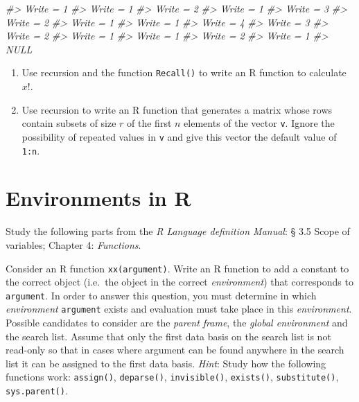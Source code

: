 \documentclass[
]{book}
\newenvironment{Shaded}{\begin{snugshade}}{\end{snugshade}}
\newcommand{\CommentTok}[1]{\textcolor[rgb]{0.56,0.35,0.01}{\textit{#1}}}
\begin{document}
\begin{Shaded}
\begin{Highlighting}[]
\CommentTok{\#\textgreater{} Write =  1 }
\CommentTok{\#\textgreater{} Write =  1 }
\CommentTok{\#\textgreater{} Write =  2 }
\CommentTok{\#\textgreater{} Write =  1 }
\CommentTok{\#\textgreater{} Write =  3 }
\CommentTok{\#\textgreater{} Write =  2 }
\CommentTok{\#\textgreater{} Write =  1 }
\CommentTok{\#\textgreater{} Write =  1 }
\CommentTok{\#\textgreater{} Write =  4 }
\CommentTok{\#\textgreater{} Write =  3 }
\CommentTok{\#\textgreater{} Write =  2 }
\CommentTok{\#\textgreater{} Write =  1 }
\CommentTok{\#\textgreater{} Write =  1 }
\CommentTok{\#\textgreater{} Write =  2 }
\CommentTok{\#\textgreater{} Write =  1}
\CommentTok{\#\textgreater{} NULL}
\end{Highlighting}
\end{Shaded}

\begin{enumerate}
\def\labelenumi{(\alph{enumi})}
\setcounter{enumi}{2}
\item
  Use recursion and the function \texttt{Recall()} to write an R function to calculate \(x!\).
\item
  Use recursion to write an R function that generates a matrix whose rows contain subsets of size \(r\) of the first \(n\) elements of the vector \texttt{v}. Ignore the possibility of repeated values in \texttt{v} and give this vector the default value of \texttt{1:n}.
\end{enumerate}

\section{Environments in R}\label{environments-in-r}

Study the following parts from the \emph{R Language definition Manual}: § 3.5 Scope of variables; Chapter 4: \emph{Functions}.

Consider an R function \texttt{xx(argument)}. Write an R function to add a constant to the correct object (i.e.~the object in the correct \emph{{environment}}) that corresponds to \texttt{argument}. In order to answer this question, you must determine in which \emph{{environment}} \texttt{argument} exists and evaluation must take place in this \emph{{environment}}. Possible candidates to consider are the \emph{{parent frame}}, the \emph{{global environment}} and the search list. Assume that only the first data basis on the search list is not read-only so that in cases where argument can be found anywhere in the search list it can be assigned to the first data basis. \emph{Hint}: Study how the following functions work: \texttt{assign()}, \texttt{deparse()}, \texttt{invisible()}, \texttt{exists()}, \texttt{substitute()}, \texttt{sys.parent()}.
\end{document}
